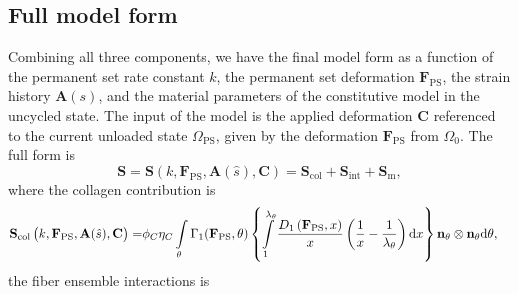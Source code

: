 \subsection{Full model form}
	Combining all three components, we have the final model form as a function of the permanent set rate constant $k $, the permanent set deformation $\mathbf{F}_\mathrm{PS}$, the strain history $\mathbf{A}(s)$, and the material parameters of the constitutive model in the uncycled state. The input of the model is the applied deformation $\mathbf{C}$ referenced to the current unloaded state $\Omega_\mathrm{PS}$, given by the deformation $\mathbf{F}_\mathrm{PS}$ from $\Omega_0$. The full form is
\begin{equation}\label{eq:fullEXLmodel}
\mathbf{S} = \mathbf{S}\left(k , \mathbf{F}_\mathrm{PS}, \mathbf{A}(\hat{s}), \mathbf{C}\right) = \mathbf{S}_\mathrm{col} + \mathbf{S}_\mathrm{int} + \mathbf{S}_\mathrm{m},
\end{equation}
where the collagen contribution is 
\begin{equation} \label{eq:fullcollagen}
\begin{split}
\mathbf{S}_\mathrm{col}\left(k , \mathbf{F}_\mathrm{PS}, \mathbf{A}(\hat{s}), \mathbf{C}\right) =& \phi_C \eta_C \int\displaylimits_\theta \Gamma_1(\mathbf{F}_{\mathrm{PS}}, \theta)\left\lbrace 
\int\displaylimits_1^{\lambda_\theta} \frac{D_1\left( \mathbf{F}_{\mathrm{PS}}, x \right)}{x} \left( \frac{1}{x}- \frac{1}{\lambda_\theta}\right) \mathrm{d}x \right\rbrace \mathbf{n}_\theta\otimes\mathbf{n}_\theta \mathrm{d}\theta,
\end{split}
\end{equation}
the fiber ensemble interactions is 
